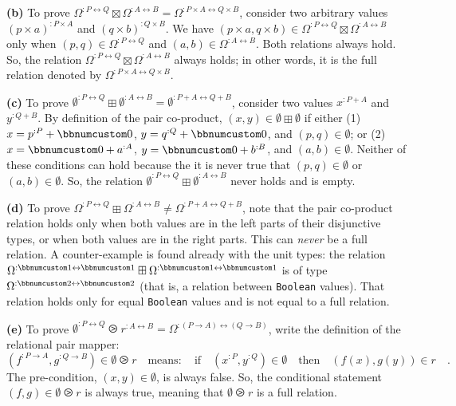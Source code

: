 \textbf{(b)} To prove $\Omega^{:P\leftrightarrow Q}\boxtimes\Omega^{:A\leftrightarrow B}=\Omega^{:P\times A\leftrightarrow Q\times B}$,
consider two arbitrary values $(p\times a)^{:P\times A}$ and $(q\times b)^{:Q\times B}$.
We have $(p\times a,q\times b)\in\Omega^{:P\leftrightarrow Q}\boxtimes\Omega^{:A\leftrightarrow B}$
only when $(p,q)\in\Omega^{:P\leftrightarrow Q}$ and $(a,b)\in\Omega^{:A\leftrightarrow B}$.
Both relations always hold. So, the relation $\Omega^{:P\leftrightarrow Q}\boxtimes\Omega^{:A\leftrightarrow B}$
always holds; in other words, it is the full relation denoted by $\Omega^{:P\times A\leftrightarrow Q\times B}$.

\textbf{(c)} To prove $\emptyset^{:P\leftrightarrow Q}\boxplus\emptyset^{:A\leftrightarrow B}=\emptyset^{:P+A\leftrightarrow Q+B}$,
consider two values $x^{:P+A}$ and $y^{:Q+B}$. By definition of
the pair co-product, $(x,y)\in\emptyset\boxplus\emptyset$ if either
(1) $x=p^{:P}+\bbnum 0$, $y=q^{:Q}+\bbnum 0$, and $(p,q)\in\emptyset$;
or (2) $x=\bbnum 0+a^{:A}$, $y=\bbnum 0+b^{:B}$, and $(a,b)\in\emptyset$.
Neither of these conditions can hold because the it is never true
that $(p,q)\in\emptyset$ or $(a,b)\in\emptyset$. So, the relation
$\emptyset^{:P\leftrightarrow Q}\boxplus\emptyset^{:A\leftrightarrow B}$
never holds and is empty.

\textbf{(d)} To prove $\Omega^{:P\leftrightarrow Q}\boxplus\Omega^{:A\leftrightarrow B}\neq\Omega^{:P+A\leftrightarrow Q+B}$,
note that the pair co-product relation holds only when both values
are in the left parts of their disjunctive types, or when both values
are in the right parts. This can \emph{never} be a full relation.
A counter-example is found already with the unit types: the relation
$\Omega^{:\bbnum 1\leftrightarrow\bbnum 1}\boxplus\Omega^{:\bbnum 1\leftrightarrow\bbnum 1}$
is of type $\Omega^{:\bbnum 2\leftrightarrow\bbnum 2}$ (that is,
a relation between \lstinline!Boolean! values). That relation holds
only for equal \lstinline!Boolean! values and is not equal to a full
relation.

\textbf{(e)} To prove $\emptyset^{:P\leftrightarrow Q}\ogreaterthan r^{:A\leftrightarrow B}=\Omega^{:(P\rightarrow A)\leftrightarrow(Q\rightarrow B)}$,
write the definition of the relational pair mapper:
\[
(f^{:P\rightarrow A},g^{:Q\rightarrow B})\in\emptyset\ogreaterthan r\quad\text{means}:\quad\text{if}\quad(x^{:P},y^{:Q})\in\emptyset\quad\text{then}\quad(f(x),g(y))\in r\quad.
\]
The pre-condition, $(x,y)\in\emptyset$, is always false. So, the
conditional statement $(f,g)\in\emptyset\ogreaterthan r$ is always
true, meaning that $\emptyset\ogreaterthan r$ is a full relation. 

